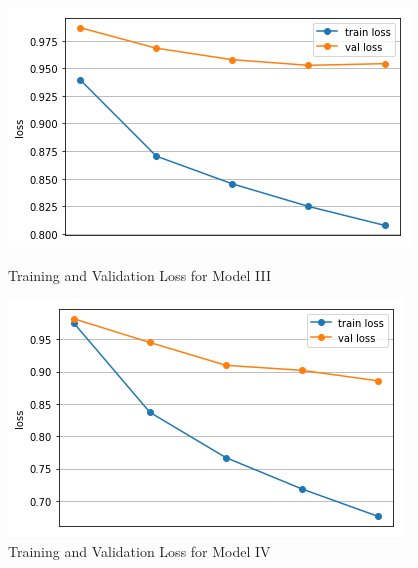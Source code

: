\documentclass[10pt]{article}
\begin{document}
\begin{figure}[]
\centering
\begin{minipage}{.4\textwidth}
  \includegraphics[width=\textwidth]{plot7}
  \caption{Training and Validation Loss for Model III}
\end{minipage}%
\hfill
\begin{minipage}{.4\textwidth}
  \includegraphics[width=\textwidth]{plot8}
  \caption{Training and Validation Loss for Model IV}
\end{minipage}
\end{figure}
\end{document}
